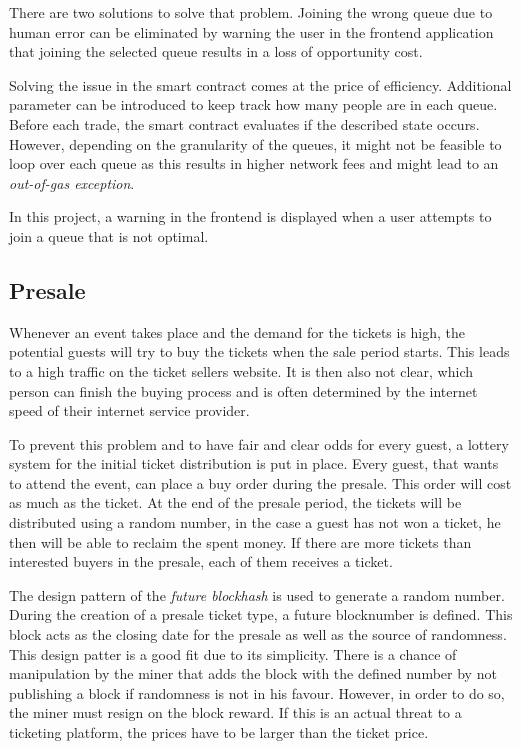 There are two solutions to solve that problem. Joining the wrong queue due to human error can be eliminated by warning the user in the frontend application that joining the selected queue results in a loss of opportunity cost. 

Solving the issue in the smart contract comes at the price of efficiency. Additional parameter can be introduced to keep track how many people are in each queue. Before each trade, the smart contract evaluates if the described state occurs. However, depending on the granularity of the queues, it might not be feasible to loop over each queue as this results in higher network fees and might lead to an 
\textit{out-of-gas exception}.

In this project, a warning in the frontend is displayed when a user attempts to join a queue that is not optimal.

\subsection{Presale}\label{section:des:presale}
Whenever an event takes place and the demand for the tickets is high, the potential guests will try to buy the tickets when the sale period starts. This leads to a high traffic on the ticket sellers website. It is then also not clear, which person can finish the buying process and is often determined by the internet speed of their internet service provider.

To prevent this problem and to have fair and clear odds for every guest, a lottery system for the initial ticket distribution is put in place. Every guest, that wants to attend the event, can place a buy order during the presale. This order will cost as much as the ticket. At the end of the presale period, the tickets will be distributed using a random number, in the case a guest has not won a ticket, he then will be able to reclaim the spent money. If there are more tickets than interested buyers in the presale, each of them receives a ticket. 

The design pattern of the \textit{future blockhash} is used to generate a random number. During the creation of a presale ticket type, a future blocknumber is defined. This block acts as the closing date for the presale as well as the source of randomness. This design patter is a good fit due to its simplicity. There is a chance of manipulation by the miner that adds the block with the defined number by not publishing a block if randomness is not in his favour. However, in order to do so, the miner must resign on the block reward. If this is an actual threat to a ticketing platform, the prices have to be larger than the ticket price. 

